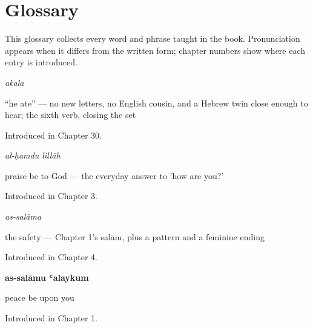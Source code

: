 
\chapter*{Glossary}

This glossary collects every word and phrase taught in the book. Pronunciation appears when it differs from the written form; chapter numbers show where each entry is introduced.

\noindent\begin{minipage}[t]{\linewidth}
\raggedright
\textbf{}\enspace\emph{akala}\par
\small \textquotedblleft{}he ate\textquotedblright{} — no new letters, no English cousin, and a Hebrew twin close enough to hear; the sixth verb, closing the set\par
\footnotesize Introduced in Chapter 30.
\end{minipage}\par\medskip

\noindent\begin{minipage}[t]{\linewidth}
\raggedright
\textbf{ }\enspace\emph{al-ḥamdu lillāh}\par
\small praise be to God — the everyday answer to 'how are you?'\par
\footnotesize Introduced in Chapter 3.
\end{minipage}\par\medskip

\noindent\begin{minipage}[t]{\linewidth}
\raggedright
\textbf{}\enspace\emph{as-salāma}\par
\small the safety — Chapter 1's salām, plus a pattern and a feminine ending\par
\footnotesize Introduced in Chapter 4.
\end{minipage}\par\medskip

\noindent\begin{minipage}[t]{\linewidth}
\raggedright
\textbf{as-salāmu ʿalaykum}\par
\small peace be upon you\par
\footnotesize Introduced in Chapter 1.
\end{minipage}\par\medskip

